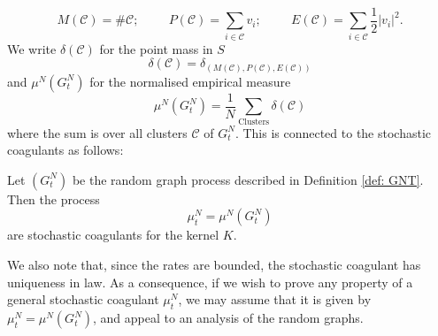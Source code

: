 \begin{equation}
   M(\mathcal{C})=\#\mathcal{C}; \hspace{1cm} P(\mathcal{C})=\sum_{i\in \mathcal{C}} v_i;\hspace{1cm} E(\mathcal{C})=\sum_{i\in \mathcal{C}} \frac{1}{2}|v_i|^2.
\end{equation} We write $\delta(\mathcal{C})$ for the point mass in $S$ \begin{equation}
    \delta(\mathcal{C})=\delta_{(M(\mathcal{C}),P(\mathcal{C}),E(\mathcal{C}))}
\end{equation} and $\mu^N(G^N_t)$ for the normalised empirical measure \begin{equation} \mu^N(G^N_t)=\frac{1}{N}\sum_\text{Clusters} \delta(\mathcal{C})\end{equation} where the sum is over all clusters $\mathcal{C}$ of $G^N_t$. This is connected to the stochastic coagulants as follows: \begin{lemma}\label{lemma: coupling} Let $(G^N_t)$ be the random graph process described in Definition \ref{def: GNT}. Then the process \begin{equation}
    \mu^N_t=\mu^N(G^N_t)
\end{equation} are stochastic coagulants for the kernel $K$. \end{lemma} We also note that, since the rates are bounded, the stochastic coagulant has uniqueness in law. As a consequence, if we wish to prove any property of a general stochastic coagulant $\mu^N_t$, we may assume that it is given by $\mu^N_t=\mu^N(G^N_t)$, and appeal to an analysis of the random graphs.
